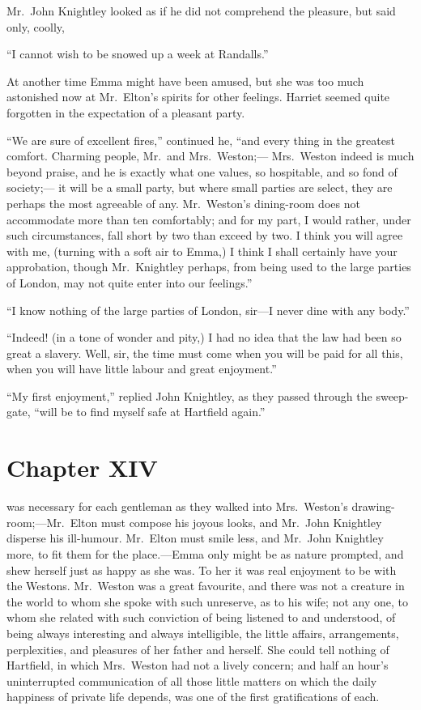 Mr.\ John Knightley looked as if he did not comprehend the pleasure,
but said only, coolly,

``I cannot wish to be snowed up a week at Randalls.''

At another time Emma might have been amused, but she was too
much astonished now at Mr.\ Elton's spirits for other feelings.
Harriet seemed quite forgotten in the expectation of a pleasant party.

``We are sure of excellent fires,'' continued he, ``and every thing
in the greatest comfort.  Charming people, Mr.\ and Mrs.\ Weston;---%
Mrs.\ Weston indeed is much beyond praise, and he is exactly
what one values, so hospitable, and so fond of society;---%
it will be a small party, but where small parties are select,
they are perhaps the most agreeable of any.  Mr.\ Weston's dining-room
does not accommodate more than ten comfortably; and for my part,
I would rather, under such circumstances, fall short by two than
exceed by two.  I think you will agree with me, (turning with a soft
air to Emma,) I think I shall certainly have your approbation,
though Mr.\ Knightley perhaps, from being used to the large parties
of London, may not quite enter into our feelings.''

``I know nothing of the large parties of London, sir---I never dine
with any body.''

``Indeed! (in a tone of wonder and pity,) I had no idea that the
law had been so great a slavery.  Well, sir, the time must come
when you will be paid for all this, when you will have little
labour and great enjoyment.''

``My first enjoyment,'' replied John Knightley, as they passed through
the sweep-gate, ``will be to find myself safe at Hartfield again.''



\chapter{Chapter XIV}


 was necessary for each gentleman
as they walked into Mrs.\ Weston's drawing-room;---Mr.\ Elton must
compose his joyous looks, and Mr.\ John Knightley disperse his
ill-humour. Mr.\ Elton must smile less, and Mr.\ John Knightley more,
to fit them for the place.---Emma only might be as nature prompted,
and shew herself just as happy as she was.  To her it was real
enjoyment to be with the Westons.  Mr.\ Weston was a great favourite,
and there was not a creature in the world to whom she spoke with
such unreserve, as to his wife; not any one, to whom she related
with such conviction of being listened to and understood, of being
always interesting and always intelligible, the little affairs,
arrangements, perplexities, and pleasures of her father and herself.
She could tell nothing of Hartfield, in which Mrs.\ Weston had not
a lively concern; and half an hour's uninterrupted communication
of all those little matters on which the daily happiness of private
life depends, was one of the first gratifications of each.

